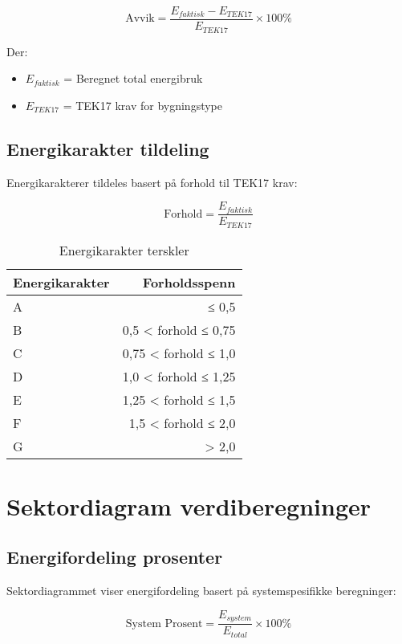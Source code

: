 \documentclass[12pt,a4paper]{article}
\begin{document}
\begin{equation}
\text{Avvik} = \frac{E_{faktisk} - E_{TEK17}}{E_{TEK17}} \times 100\%
\end{equation}

Der:
\begin{itemize}
\item $E_{faktisk}$ = Beregnet total energibruk
\item $E_{TEK17}$ = TEK17 krav for bygningstype
\end{itemize}

\subsection{Energikarakter tildeling}

Energikarakterer tildeles basert på forhold til TEK17 krav:

\begin{equation}
\text{Forhold} = \frac{E_{faktisk}}{E_{TEK17}}
\end{equation}

\begin{table}[H]
\centering
\begin{tabular}{|l|r|}
\hline
\textbf{Energikarakter} & \textbf{Forholdsspenn} \\
\hline
A & ≤ 0,5 \\
B & 0,5 < forhold ≤ 0,75 \\
C & 0,75 < forhold ≤ 1,0 \\
D & 1,0 < forhold ≤ 1,25 \\
E & 1,25 < forhold ≤ 1,5 \\
F & 1,5 < forhold ≤ 2,0 \\
G & > 2,0 \\
\hline
\end{tabular}
\caption{Energikarakter terskler}
\end{table}

\section{Sektordiagram verdiberegninger}

\subsection{Energifordeling prosenter}

Sektordiagrammet viser energifordeling basert på systemspesifikke beregninger:

\begin{equation}
\text{System Prosent} = \frac{E_{system}}{E_{total}} \times 100\%
\end{equation}
\end{document}
